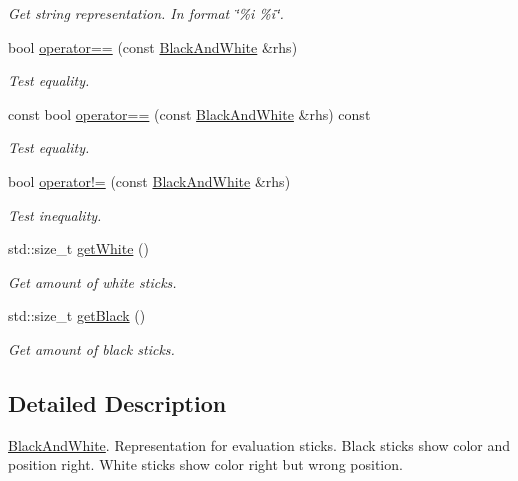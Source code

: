 \begin{DoxyCompactItemize}
\begin{DoxyCompactList}\small\item\em Get string representation. In format \char`\"{}\%i \%i\char`\"{}. \end{DoxyCompactList}\item 
bool \hyperlink{classmastermind_1_1_black_and_white_a218f949e75ce9e080c262f87a2263916}{operator==} (const \hyperlink{classmastermind_1_1_black_and_white}{Black\+And\+White} \&rhs)
\begin{DoxyCompactList}\small\item\em Test equality. \end{DoxyCompactList}\item 
const bool \hyperlink{classmastermind_1_1_black_and_white_a55c1255c7d53d52a053489c6d62a9762}{operator==} (const \hyperlink{classmastermind_1_1_black_and_white}{Black\+And\+White} \&rhs) const
\begin{DoxyCompactList}\small\item\em Test equality. \end{DoxyCompactList}\item 
bool \hyperlink{classmastermind_1_1_black_and_white_a706941b33714b6764811e14780183ed9}{operator!=} (const \hyperlink{classmastermind_1_1_black_and_white}{Black\+And\+White} \&rhs)
\begin{DoxyCompactList}\small\item\em Test inequality. \end{DoxyCompactList}\item 
std\+::size\+\_\+t \hyperlink{classmastermind_1_1_black_and_white_a70cbebcdb3ad3f8708727ef51aef724f}{get\+White} ()
\begin{DoxyCompactList}\small\item\em Get amount of white sticks. \end{DoxyCompactList}\item 
std\+::size\+\_\+t \hyperlink{classmastermind_1_1_black_and_white_a470f5b3e118ca8da4d5bfb484505d0c8}{get\+Black} ()
\begin{DoxyCompactList}\small\item\em Get amount of black sticks. \end{DoxyCompactList}\end{DoxyCompactItemize}


\subsection{Detailed Description}
\hyperlink{classmastermind_1_1_black_and_white}{Black\+And\+White}. Representation for evaluation sticks. Black sticks show color and position right. White sticks show color right but wrong position. 

